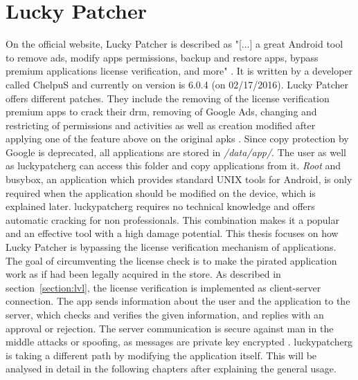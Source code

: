 \section{Lucky Patcher} \label{section:luckypatcher-explain}
On the official website, Lucky Patcher is described as "[...] a great Android tool to remove ads, modify apps permissions, backup and restore apps, bypass premium applications license verification, and more" \cite{luckyPatcherOfficial}.
It is written by a developer called ChelpuS and currently on version is 6.0.4 (on 02/17/2016).
\newline
Lucky Patcher offers different patches.
They include the removing of the license verification premium apps to crack their \gls{drm}, removing of Google Ads, changing and restricting of permissions and activities as well as creation modified after applying one of the feature above on the original \gls{apk}s \cite{luckyPatcherOfficial}.
Since copy protection by Google is deprecated, all applications are stored in \textit{/data/app/}.
The user as well as \gls{luckypatcherg} can access this folder and copy applications from it.
\textit{Root} and busybox, an application which provides standard UNIX tools for Android\cite{busyboxApp}, is only required when the application should be modified on the device, which is explained later.
\gls{luckypatcherg} requires no technical knowledge and offers automatic cracking for non professionals.
This combination makes it a popular and an effective tool with a high damage potential. \cite{munteanLicense}
\newline
This thesis focuses on how Lucky Patcher is bypassing the license verification mechanism of applications.
The goal of circumventing the license check is to make the pirated application work as if had been legally acquired in the store.
As described in section~\ref{section:lvl}, the license verification is implemented as client-server connection.
The app sends information about the user and the application to the server, which checks and verifies the given information, and replies with an approval or rejection.
The server communication is secure against man in the middle attacks or spoofing, as messages are private key encrypted \cite{munteanLicense}.
\gls{luckypatcherg} is taking a different path by modifying the application itself. This will be analysed in detail in the following chapters after explaining the general usage.
\newline
